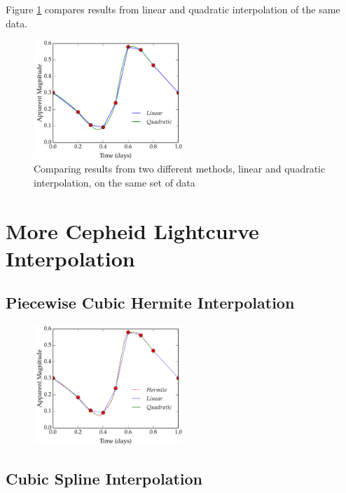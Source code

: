 \documentclass[11pt,letterpaper]{article}
\begin{document}
Figure \ref{fig:DiffInter} compares results from linear and quadratic interpolation of the same data.

\begin{figure}[h!]
	\centering
	\includegraphics[width=0.5\textwidth]{DiffInter}
	\caption{Comparing results from two different methods, linear and quadratic interpolation, on the same set of data}
	\label{fig:DiffInter}
\end{figure}


\section{More Cepheid Lightcurve Interpolation}

\subsection{Piecewise Cubic Hermite Interpolation}

\begin{figure}[h!]
	\centering
	\includegraphics[width=0.5\textwidth]{HermiteInter}
	\caption{}
	\label{fig:HermiteInter}
\end{figure}

\subsection{Cubic Spline Interpolation}
\end{document}
